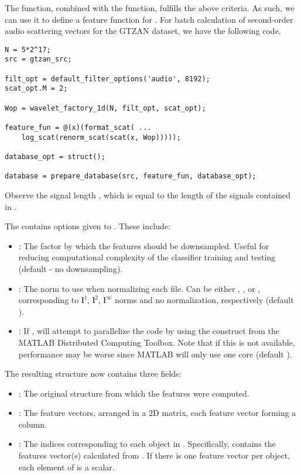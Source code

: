 \documentclass[twocolumn]{article}
\begin{document}
The  function, combined with the  function, fulfills the above criteria. As such, we can use it to define a feature function for . For batch calculation of second-order audio scattering vectors for the GTZAN dataset, we have the following code.
\begin{lstlisting}
N = 5*2^17;
src = gtzan_src;

filt_opt = default_filter_options('audio', 8192);
scat_opt.M = 2;

Wop = wavelet_factory_1d(N, filt_opt, scat_opt);

feature_fun = @(x)(format_scat( ...
	log_scat(renorm_scat(scat(x, Wop)))));
	
database_opt = struct();
	
database = prepare_database(src, feature_fun, database_opt);
\end{lstlisting}
Observe the signal length , which is equal to the length of the signals contained in . 

The  contains options given to . These include:
\begin{itemize}
	\item {}: The factor by which the features should be downsampled. Useful for reducing computational complexity of the classifier training and testing (default  - no downsampling).
	\item {}: The norm to use when normalizing each file. Can be either , ,  or \mcode{[]}, corresponding to $\mathbf{l}^1$, $\mathbf{l}^2$, $\mathbf{l}^\infty$ norms and no normalization, respectively (default \mcode{[]}).
	\item {}: If ,  will attempt to parallelize the code by using the  construct from the MATLAB Distributed Computing Toolbox. Note that if this is not available, performance may be worse since MATLAB will only use one core (default ).
\end{itemize}

The resulting  structure now contains three fields:
\begin{itemize}
	\item {}: The original  structure from which the features were computed.
	\item {}: The feature vectors, arranged in a 2D matrix, each feature vector forming a column.
	\item {}: The indices corresponding to each object in . Specifically,  contains the features vector(s) calculated from . If there is one feature vector per object, each element of  is a scalar.
\end{itemize}
\end{document}
